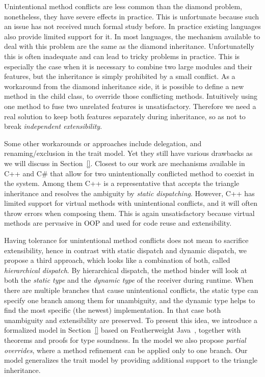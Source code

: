 Unintentional method conflicts are less common than the diamond
problem, nonetheless, they have severe effects in practice. This is
unfortunate because such an issue has not received much formal study 
before. In practice existing languages also provide limited support for
it. In most languages, the mechanism available to deal with this problem are the same as the diamond
inheritance. Unfortunatelly this is often inadequate and can lead 
to tricky problems in practice. This is especially the case
when it is necessary to combine two large modules and their features,
but the inheritance is simply prohibited by a small conflict. As
a workaround from the diamond inheritance side, it is possible to
define a new method in the child class, to override those conflicting
methods. Intuitively using one method to fuse two unrelated features
is unsatisfactory. Therefore we need a real solution to keep both
features separately during inheritance, so as not to break
\emph{independent extensibility}\cite{odersky}.

Some other workarounds or approaches include delegation, and
renaming/exclusion in the trait model. Yet they still have various
drawbacks as we will discuss in Section~\ref{}. Closest to our work
are mechanisms available in C++ and C\# that allow for two
unintentionally conflicted method to coexist in the system. Among them
C++ is a representative that accepts the triangle inheritance and
resolves the ambiguity by \emph{static dispatching}. However, C++ has
limited support for virtual methods with unintentional conflicts, and
it will often throw errors when composing them. This is again
unsatisfactory because virtual methods are pervasive in OOP and used 
for code reuse and extensibility.

Having tolerance for unintentional method conflicts does not mean to
sacrifice extensibility, hence in contrast with static dispatch and
dynamic dispatch, we propose a third approach, which looks like a
combination of both, called \textit{hierarchical dispatch}. By
hierarchical dispatch, the method binder will look at both the \emph{static
type} and the \emph{dynamic type} of the receiver during runtime. When there
are multiple branches that cause unintentional conflicts, the static
type can specify one branch among them for unambiguity, and the
dynamic type helps to find the most specific (the newest)
implementation. In that case both unambiguity and extensibility are
preserved. To present this idea, we introduce a formalized model in
Section~\ref{} based on Featherweight Java~\cite{}, together with theorems and
proofs for type soundness. In the model we also propose
\textit{partial overrides}, where a method refinement can be applied
only to one branch. Our model generalizes the trait
model by providing additional support to the triangle inheritance.

